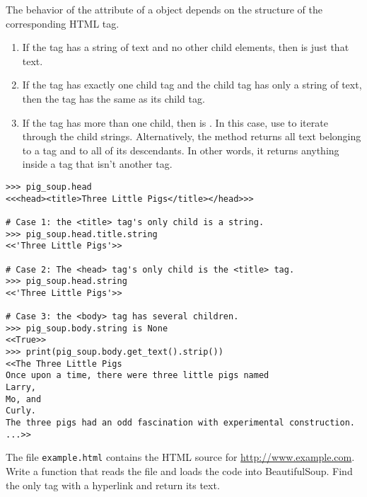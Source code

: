\begin{info}
The behavior of the  attribute of a  object depends on the structure of the corresponding HTML tag.
\begin{enumerate}
    \item If the tag has a string of text and no other child elements, then  is just that text.
    \item If the tag has exactly one child tag and the child tag has only a string of text, then the tag has the same  as its child tag.
    \item If the tag has more than one child, then  is .
    In this case, use  to iterate through the child strings.
    Alternatively, the  method returns all text belonging to a tag and to all of its descendants.
    In other words, it returns anything inside a tag that isn't another tag.
\end{enumerate}

\begin{lstlisting}
>>> pig_soup.head
<<<head><title>Three Little Pigs</title></head>>>

# Case 1: the <title> tag's only child is a string.
>>> pig_soup.head.title.string
<<'Three Little Pigs'>>

# Case 2: The <head> tag's only child is the <title> tag.
>>> pig_soup.head.string
<<'Three Little Pigs'>>

# Case 3: the <body> tag has several children.
>>> pig_soup.body.string is None
<<True>>
>>> print(pig_soup.body.get_text().strip())
<<The Three Little Pigs
Once upon a time, there were three little pigs named
Larry,
Mo, and
Curly.
The three pigs had an odd fascination with experimental construction.
...>>
\end{lstlisting}
\end{info}

\begin{problem}
The file \texttt{example.html} contains the HTML source for \url{http://www.example.com}.
Write a function that reads the file and loads the code into BeautifulSoup.
Find the only  tag with a hyperlink and return its text.
\end{problem}

\begin{comment}
\begin{problem} %

Write a function that returns the following line using three different methods.
\begin{lstlisting}
<<'More information...'>>
\end{lstlisting}
The function should accept an integer.
If the integer is 1, find the line using tag names and the \li{.string} method.
If the integer is 2, find the line by traversing through the children of the body tag with repeated calls to \li{.contents}.
If the integer is 3, find the line by using navigation between siblings and \li{.string}.
\end{problem}
\end{comment}

